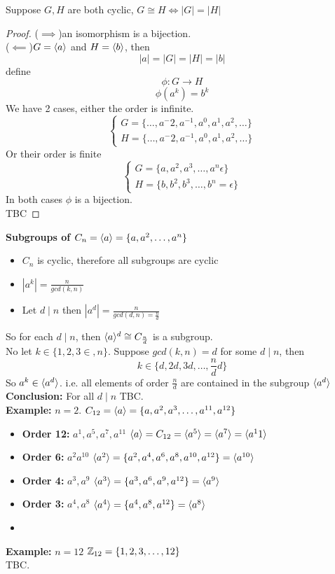 \documentclass[openany]{report}
\begin{document}
\begin{theorem}
    Suppose $G, H$ are both cyclic, $G \cong H \iff |G| = |H|$
\end{theorem}
\begin{proof}
    ($\implies$)an isomorphism is a bijection.\\[1ex]
    ($\impliedby$)$G = \langle a \rangle$ and $H = \langle b \rangle$, then 
    $$|a| = |G| = |H| = |b|$$
    define 
    $$\phi: G \rightarrow H$$
    $$\phi(a^k) = b^k$$
    We have 2 cases, either the order is infinite.
    $$\begin{cases}
        G = \{\dots, a^-{2}, a^{-1}, a^0, a^1, a^2, \dots\}\\
         H = \{\dots, a^-{2}, a^{-1}, a^0, a^1, a^2, \dots\}
    \end{cases}$$
    Or their order is finite
    $$\begin{cases}
        G = \{a, a^2, a^3, \dots, a^n \epsilon\}\\
        H = \{b, b^2, b^3, \dots, b^n = \epsilon\}
    \end{cases}$$
    In both cases $\phi$ is a bijection. \\
    TBC
\end{proof}

\textbf{Subgroups of $C_n = \langle a \rangle = \{a, a^2,\dots, a^n\}$}
\begin{itemize}
    \item $C_n$ is cyclic, therefore all subgroups are cyclic
    \item $|a^k| = \frac{n}{gcd(k,n)}$
    \item Let $d \mid n$ then $|a^d| = \frac{n}{gcd(d,n) = \frac{n}{d}}$
\end{itemize}
So for each $d \mid n$, then $\langle a \rangle^d \cong C_{\frac{n}{d}}$ is a subgroup.\\[1ex]
No let $k \in \{1,2,3\in, n\}$. Suppose $gcd(k,n) = d$ for some $d \mid n$, then 
$$k \in \{d, 2d, 3d, \dots, \frac{n}{d}d\}$$
So $a^k \in \langle a^d \rangle$. i.e. all elements of order $\frac{n}{d}$ are contained in the subgroup $\langle a^d \rangle$\\[2ex]
\textbf{Conclusion:} For all $d \mid n$ TBC.\\[3ex]
\textbf{Example:} $n = 2$. $C_{12} = \langle a \rangle = \{a,a^2, a^3, \dots, a^{11}, a^{12}\}$
\begin{itemize}
    \item \textbf{Order 12:} $a^1,a^5,a^7,a^11$ $\langle a \rangle = C_{12} = \langle a^5 \rangle = \langle a^7 \rangle = \langle a^11 \rangle$
     \item \textbf{Order 6:} $a^2a^{10}$ $\langle a^2 \rangle = \{a^2,a^4,a^6,a^8,a^{10},a^{12}\} = \langle a^{10} \rangle$
     \item \textbf{Order 4:} $a^3,a^9$ $\langle a^3 \rangle = \{a^3,a^6, a^9, a^{12}\} = \langle a^9 \rangle$
     \item \textbf{Order 3:} $a^4,a^8$ $\langle a^4 \rangle = \{a^4,a^8, a^{12}\} = \langle a^8 \rangle$
     \item
\end{itemize}
\textbf{Example:} $n = 12$ $\mathbb{Z}_{12} = \{1,2,3,\dots,12\}$\\
TBC. 
\end{document}
